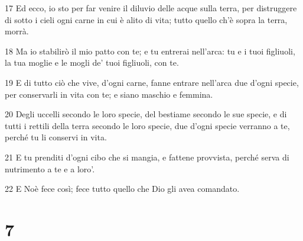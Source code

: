 \par 17 Ed ecco, io sto per far venire il diluvio delle acque sulla terra, per distruggere di sotto i cieli ogni carne in cui è alito di vita; tutto quello ch'è sopra la terra, morrà.
\par 18 Ma io stabilirò il mio patto con te; e tu entrerai nell'arca: tu e i tuoi figliuoli, la tua moglie e le mogli de' tuoi figliuoli, con te.
\par 19 E di tutto ciò che vive, d'ogni carne, fanne entrare nell'arca due d'ogni specie, per conservarli in vita con te; e siano maschio e femmina.
\par 20 Degli uccelli secondo le loro specie, del bestiame secondo le sue specie, e di tutti i rettili della terra secondo le loro specie, due d'ogni specie verranno a te, perché tu li conservi in vita.
\par 21 E tu prenditi d'ogni cibo che si mangia, e fattene provvista, perché serva di nutrimento a te e a loro'.
\par 22 E Noè fece così; fece tutto quello che Dio gli avea comandato.

\chapter{7}

